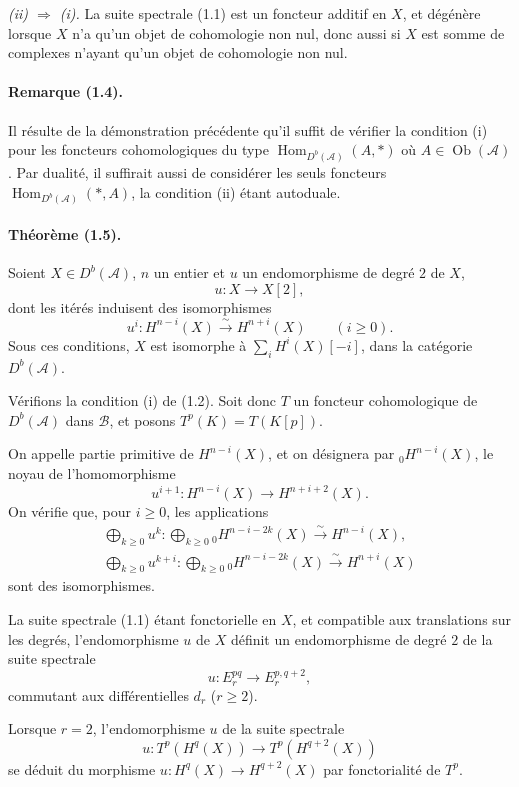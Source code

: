 \documentclass[10pt]{article}
\newcommand{\Acal}{\mathcal A}
\newcommand{\Bcal}{\mathcal B}
\newcommand{\Db}{D^b}
\newcommand{\Hom}{\operatorname{Hom}}
\newcommand{\iso}{\xrightarrow{\sim}}
\newcommand{\og}{\guillemotleft}
\newcommand{\fg}{\guillemotright}
\providecommand{\og}{\guillemotleft}
\providecommand{\fg}{\guillemotright}
\begin{document}
\emph{(ii) $\Rightarrow$ (i).} La suite spectrale (1.1) est un foncteur additif en $X$, et dégénère lorsque $X$ n'a qu'un objet de cohomologie non nul, donc aussi si $X$ est somme de complexes n'ayant qu'un objet de cohomologie non nul.

\paragraph{Remarque (1.4).} Il résulte de la démonstration précédente qu'il suffit de vérifier la condition (i) pour les foncteurs cohomologiques du type $\Hom_{\Db(\Acal)}(A,*)$ où $A\in\operatorname{Ob}(\Acal)$. Par dualité, il suffirait aussi de considérer les seuls foncteurs $\Hom_{\Db(\Acal)}(*,A)$, la condition (ii) étant autoduale.

\paragraph{Théorème (1.5).} Soient $X\in\Db(\Acal)$, $n$ un entier et $u$ un endomorphisme de degré $2$ de $X$,
\[
u:X\longrightarrow X[2],
\]
dont les itérés induisent des isomorphismes
\[
u^i:H^{n-i}(X)\iso H^{n+i}(X)\qquad(i\ge0).
\]
Sous ces conditions, $X$ est isomorphe à $\sum_i H^i(X)[-i]$, dans la catégorie $\Db(\Acal)$.

Vérifions la condition (i) de (1.2). Soit donc $T$ un foncteur cohomologique de $\Db(\Acal)$ dans $\Bcal$, et posons $T^p(K)=T(K[p])$.

On appelle partie primitive de $H^{n-i}(X)$, et on désignera par ${}_0H^{n-i}(X)$, le noyau de l'homomorphisme
\[
u^{i+1}:H^{n-i}(X)\longrightarrow H^{n+i+2}(X).
\]
On vérifie que, pour $i\ge0$, les applications
\[
\tag{1.6}
\begin{gathered}
\bigoplus_{k\ge0} u^k:\bigoplus_{k\ge0}{}_0H^{n-i-2k}(X)\iso H^{n-i}(X),\\
\bigoplus_{k\ge0}u^{k+i}:\bigoplus_{k\ge0}{}_0H^{n-i-2k}(X)\iso H^{n+i}(X)
\end{gathered}
\]
sont des isomorphismes.

La suite spectrale (1.1) étant fonctorielle en $X$, et \og compatible\fg{} aux translations sur les degrés, l'endomorphisme $u$ de $X$ définit un endomorphisme de degré $2$ de la suite spectrale
\[
u:E_r^{pq}\longrightarrow E_r^{p,q+2},
\]
commutant aux différentielles $d_r$ ($r\ge2$).

Lorsque $r=2$, l'endomorphisme $u$ de la suite spectrale
\[
u:T^p(H^q(X))\longrightarrow T^p(H^{q+2}(X))
\]
se déduit du morphisme $u:H^q(X)\to H^{q+2}(X)$ par fonctorialité de $T^p$.
\end{document}
